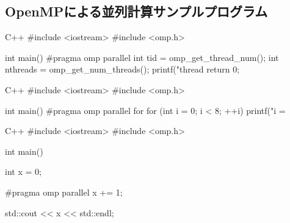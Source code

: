 \documentclass[12pt]{jreport}
\begin{document}
\subsection{OpenMPによる並列計算サンプルプログラム}

\begin{codebox}{C++}
#include <iostream>
#include <omp.h>

int main() {
#pragma omp parallel
    {
        int tid = omp_get_thread_num();
        int nthreads = omp_get_num_threads();
        printf("thread %
    }
    return 0;
}
\end{codebox}

\begin{codebox}{C++}
#include <iostream>
#include <omp.h>

int main() {
#pragma omp parallel for
    for (int i = 0; i < 8; ++i) {
        printf("i = %
    }
}
\end{codebox}

\begin{codebox}{C++}
#include <iostream>
#include <omp.h>

int main() {
    int x = 0;

#pragma omp parallel
    {
        x += 1;
    }

    std::cout << x << std::endl;
}
\end{codebox}
\end{document}
